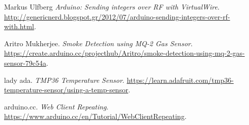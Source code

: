 \documentclass[twoside,a4paper]{article}
\begin{document}
\begin{thebibliography}{9}
Markus Ulfberg
\textit{Arduino: Sending integers over RF with VirtualWire}. 
\url{http://genericnerd.blogspot.gr/2012/07/arduino-sending-integers-over-rf-with.html}.
 
Aritro Mukherjee. 
\textit{Smoke Detection using MQ-2 Gas Sensor}.
\url{https://create.arduino.cc/projecthub/Aritro/smoke-detection-using-mq-2-gas-sensor-79c54a}.
 
lady ada. 
\textit{TMP36 Temperature Sensor}.
\url{https://learn.adafruit.com/tmp36-temperature-sensor/using-a-temp-sensor}.
 
arduino.cc. 
\textit{Web Client Repeating}.
\url{https://www.arduino.cc/en/Tutorial/WebClientRepeating}.
 
\end{thebibliography}
\end{document}
